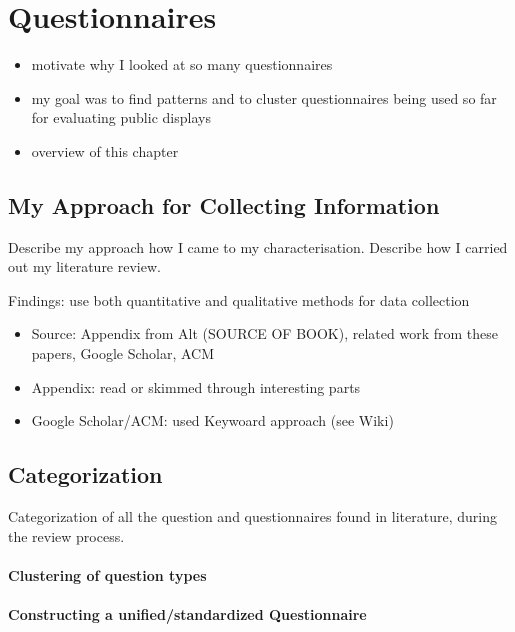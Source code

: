 \section{Questionnaires}
\label{sec:questionnaires}


\begin{itemize}[itemsep=0pt] 
\item motivate why I looked at so many questionnaires
\item my goal was to find patterns and to cluster questionnaires being used so far for evaluating public displays
\item overview of this chapter
\end{itemize}




\subsection{My Approach for Collecting Information}

Describe my approach how I came to my characterisation. Describe how I carried out my literature review.

Findings: use both quantitative and qualitative methods for data collection

\begin{itemize}[itemsep=0pt] 
\item Source: Appendix from Alt (SOURCE OF BOOK), related work from these papers, Google Scholar, ACM
\item Appendix: read or skimmed through interesting parts
\item Google Scholar/ACM: used Keywoard approach (see Wiki)
\end{itemize}



\subsection{Categorization}

Categorization of all the question and questionnaires found in literature, during the review process.

\paragraph{Clustering of question types}

\paragraph{Constructing a unified/standardized Questionnaire}

